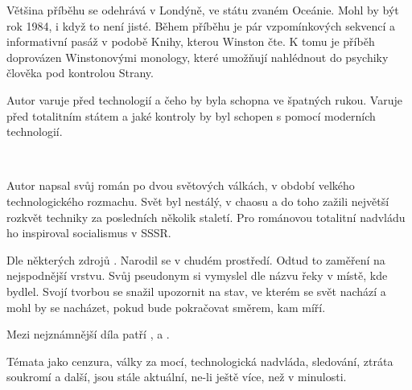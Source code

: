 \documentclass[FGBook.tex]{subfiles}
\begin{document}
\noindent 
Většina příběhu se odehrává v Londýně, ve státu zvaném Oceánie.
Mohl by být rok 1984, i když to není jisté.
Během příběhu je pár vzpomínkových sekvencí a informativní pasáž v podobě Knihy, kterou Winston čte.
K tomu je příběh doprovázen Winstonovými monology, které umožňují nahlédnout do psychiky člověka pod kontrolou Strany.

\noindent
Autor varuje před technologií a čeho by byla schopna ve špatných rukou.
Varuje před totalitním státem a jaké kontroly by byl schopen s pomocí moderních technologií. 

\vspace*{2em}\\

Autor napsal svůj román po dvou světových válkách, v období velkého technologického rozmachu.
Svět byl nestálý, v chaosu a do toho zažili největší rozkvět techniky za posledních několik staletí.
Pro románovou totalitní nadvládu ho inspiroval socialismus v SSSR.




\noindent 
Dle některých zdrojů .
Narodil se v chudém prostředí.
Odtud to zaměření na nejspodnější vrstvu.
Svůj pseudonym si vymyslel dle názvu řeky v místě, kde bydlel.
Svojí tvorbou se snažil upozornit na stav, ve kterém se svět nachází a mohl by se nacházet, pokud bude pokračovat směrem, kam míří.


\noindent Mezi nejznámnější díla patří ,  a .




\noindent
Témata jako cenzura, války za mocí, technologická nadvláda, sledování,
ztráta soukromí a další, jsou stále aktuální, ne-li ještě více, než v minulosti.
\end{document}
